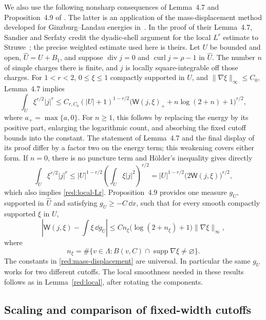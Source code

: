 We also use the following nonsharp consequences of Lemma~4.7 and
Proposition~4.9 of \cite{SandierSerfaty2012}.
The latter is an application of the mass-displacement method developed
for Ginzburg--Landau energies in~\cite{SandierSerfatyMassDisplacement2011}.
In the proof of their Lemma~4.7, Sandier and Serfaty credit the
dyadic-shell argument for the local $L^r$ estimate to
Struwe~\cite{Struwe1994}; the precise weighted estimate used here is
theirs.
Let $U$ be bounded and open, $\widehat U=U+B_1$, and suppose
$\operatorname{div}j=0$ and $\operatorname{curl}j=\rho-1$
in $\widehat U$.  The number $n$ of simple charges there is finite,
and $j$ is locally square-integrable off those charges.
For $1<r<2$, $0\le\xi\le1$ compactly supported in $U$, and
$\|\nabla\xi\|_\infty\le C_0$, Lemma~4.7 implies
\begin{equation}\label{red:local-Lr}
 \int_U\xi^{r/2}|j|^r
 \le C_{r,C_0}(|U|+1)^{1-r/2}
 \bigl(\mathsf W(j,\xi)_++n\log(2+n)+1\bigr)^{r/2},
\end{equation}
where $a_+=\max\{a,0\}$.
For $n\ge1$, this follows by replacing the energy by its positive
part, enlarging the logarithmic count, and absorbing the fixed cutoff
bounds into the constant.  The statement of Lemma~4.7 and the final
display of its proof differ by a factor two on the energy term; this
weakening covers either form.  If $n=0$, there is no puncture term and
H\"older's inequality gives directly
\[
 \int_U\xi^{r/2}|j|^r
 \le |U|^{1-r/2}\left(\int_U\xi|j|^2\right)^{r/2}
 =|U|^{1-r/2}\bigl(2\mathsf W(j,\xi)\bigr)^{r/2},
\]
which also implies \eqref{red:local-Lr}.
Proposition~4.9 provides one measure $g_U$, supported in $\widehat U$
and satisfying $g_U\ge-C\,\dd x$, such that
for every smooth compactly supported $\xi$ in $U$,
\begin{equation}\label{red:mass-displacement}
 \left|\mathsf W(j,\xi)-\int\xi\,\dd g_U\right|
 \le C n_\xi\bigl(\log(2+n_\xi)+1\bigr)
                  \|\nabla\xi\|_\infty,
\end{equation}
where
\[
 n_\xi=\#\{v\in\Lambda:
       B(v,C)\cap\operatorname{supp}\nabla\xi\ne\varnothing\}.
\]
The constants in \eqref{red:mass-displacement} are universal.
In particular the same $g_U$ works for two different cutoffs.
The local smoothness needed in these results follows as in
Lemma~\ref{red:local}, after rotating the components.

\subsection{Scaling and comparison of fixed-width cutoffs}

